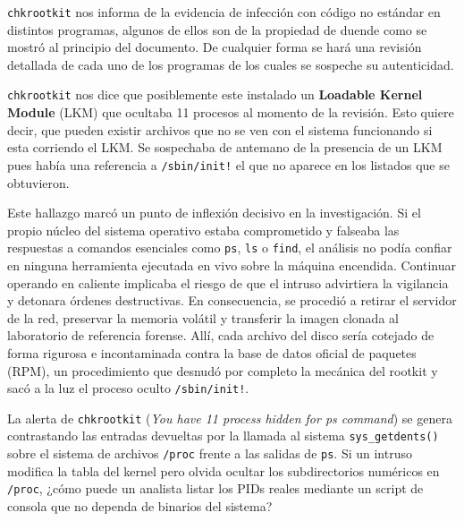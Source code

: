 \vspace{1em}

 \texttt{chkrootkit} nos informa de la evidencia de infección con código no
estándar en distintos programas, algunos de ellos son de la propiedad
de duende como se mostró al principio del documento. De cualquier forma
se hará una revisión detallada de cada uno de los programas de los cuales
se sospeche su autenticidad.

 \texttt{chkrootkit} nos dice que posiblemente este instalado un \textbf{Loadable
Kernel Module} (LKM) que ocultaba 11 procesos al momento de la revisión. 
Esto quiere decir, que pueden existir archivos que no se ven con el sistema 
funcionando si esta corriendo el LKM. Se sospechaba de antemano de la presencia 
de un LKM pues había una referencia a \texttt{/sbin/init!} el que no aparece en los
listados que se obtuvieron.

Este hallazgo marcó un punto de inflexión decisivo en la investigación. Si el propio núcleo del sistema operativo estaba comprometido y falseaba las respuestas a comandos esenciales como \texttt{ps}, \texttt{ls} o \texttt{find}, el análisis no podía confiar en ninguna herramienta ejecutada en vivo sobre la máquina encendida. Continuar operando en caliente implicaba el riesgo de que el intruso advirtiera la vigilancia y detonara órdenes destructivas. En consecuencia, se procedió a retirar el servidor de la red, preservar la memoria volátil y transferir la imagen clonada al laboratorio de referencia forense. Allí, cada archivo del disco sería cotejado de forma rigurosa e incontaminada contra la base de datos oficial de paquetes (RPM), un procedimiento que desnudó por completo la mecánica del rootkit y sacó a la luz el proceso oculto \texttt{/sbin/init!}.

\begin{retoforense}
La alerta de \texttt{chkrootkit} (\textit{You have 11 process hidden for ps command}) se genera contrastando las entradas devueltas por la llamada al sistema \texttt{sys\_getdents()} sobre el sistema de archivos \texttt{/proc} frente a las salidas de \texttt{ps}. Si un intruso modifica la tabla del kernel pero olvida ocultar los subdirectorios numéricos en \texttt{/proc}, ¿cómo puede un analista listar los PIDs reales mediante un script de consola que no dependa de binarios del sistema?
\end{retoforense}

